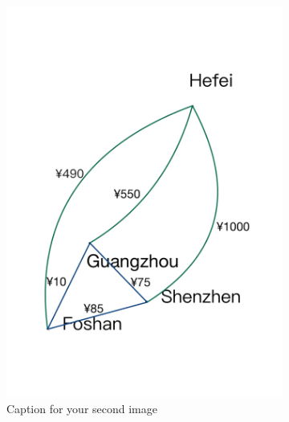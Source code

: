 \documentclass{extarticle}
\begin{document}
\begin{figure}[!ht]
  \centering
  \begin{subfigure}{0.3\textwidth}
      \includegraphics[width=\textwidth]{pic/1.png}
      \caption{Caption for your second image}%
\label{fig:your_image1}
  \end{subfigure}
  \hfill %
  \begin{subfigure}{0.3\textwidth}

\end{subfigure}
\end{figure}
\end{document}
